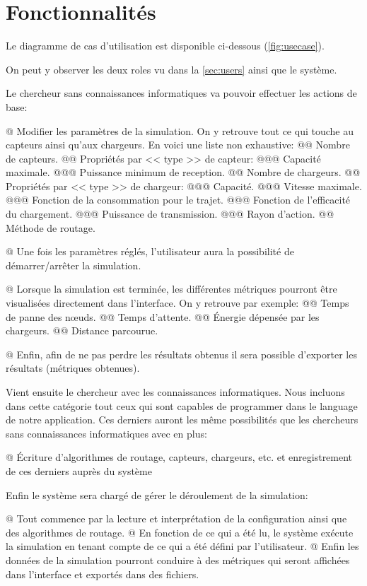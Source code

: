 \documentclass[final]{polytech/polytech}
\begin{document}
	
	\section{Fonctionnalités}
		Le diagramme de cas d'utilisation est disponible ci-dessous (\autoref{fig:usecase}).
		
		On peut y observer les deux roles vu dans la \autoref{sec:users} ainsi que le système.
		
		Le chercheur sans connaissances informatiques va pouvoir effectuer les actions de base:
		\begin{easylist}[itemize]
			@ Modifier les paramètres de la simulation.
			On y retrouve tout ce qui touche au capteurs ainsi qu'aux chargeurs.
			En voici une liste non exhaustive:
			@@ Nombre de capteurs.
			@@ Propriétés par << type >> de capteur:
			@@@ Capacité maximale.
			@@@ Puissance minimum de reception.
			@@ Nombre de chargeurs.
			@@ Propriétés par << type >> de chargeur:
			@@@ Capacité.
			@@@ Vitesse maximale.
			@@@ Fonction de la consommation pour le trajet.
			@@@ Fonction de l'efficacité du chargement.
			@@@ Puissance de transmission.
			@@@ Rayon d'action.
			@@ Méthode de routage.
			
			@ Une fois les paramètres réglés, l'utilisateur aura la possibilité de démarrer/arrêter la simulation.
			
			@ Lorsque la simulation est terminée, les différentes métriques pourront être visualisées directement dans l'interface.
			On y retrouve par exemple:
			@@ Temps de panne des n\oe uds.
			@@ Temps d'attente.
			@@ Énergie dépensée par les chargeurs.
			@@ Distance parcourue.
			
			@ Enfin, afin de ne pas perdre les résultats obtenus il sera possible d'exporter les résultats (métriques obtenues).
		\end{easylist}
		
		Vient ensuite le chercheur avec les connaissances informatiques.
		Nous incluons dans cette catégorie tout ceux qui sont capables de programmer dans le language de notre application.
		Ces derniers auront les même possibilités que les chercheurs sans connaissances informatiques avec en plus:
		\begin{easylist}[itemize]
			@ Écriture d'algorithmes de routage, capteurs, chargeurs, etc. et enregistrement de ces derniers auprès du système
		\end{easylist}
		
		Enfin le système sera chargé de gérer le déroulement de la simulation:
		\begin{easylist}[itemize]
			@ Tout commence par la lecture et interprétation de la configuration ainsi que des algorithmes de routage.
			@ En fonction de ce qui a été lu, le système exécute la simulation en tenant compte de ce qui a été défini par l'utilisateur.
			@ Enfin les données de la simulation pourront conduire à des métriques qui seront affichées dans l'interface et exportés dans des fichiers.
		\end{easylist}
\end{document}
